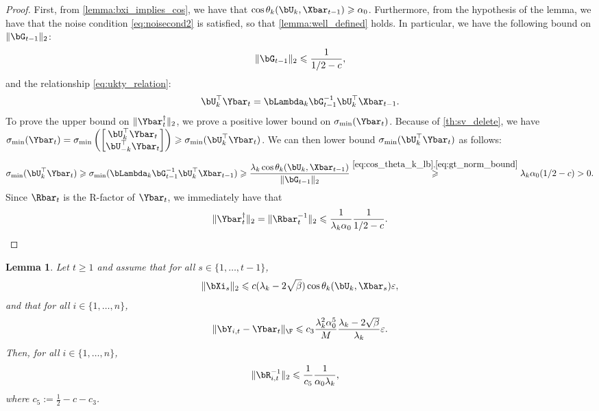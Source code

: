 \documentclass{article}
\theoremstyle{plain}
\newtheorem{lemma}[theorem]{Lemma}
\theoremstyle{definition}
\theoremstyle{remark}
\begin{document}
\begin{proof}
  First, from \cref{lemma:bxi_implies_cos}, we have that $\cos \theta_k(\bU_k, \Xbar_{t-1}) \geqslant \alpha_0$. Furthermore, from the hypothesis of the lemma, we have that the noise condition \eqref{eq:noisecond2} is satisfied, so that \cref{lemma:well_defined} holds. In particular, we have the following bound on $\Vert\bG_{t-1}\Vert_2$:
  \begin{align}\label{eq:gt_norm_bound}
    \Vert \bG_{t-1} \Vert_2 \leqslant \frac{1}{1/2 - c},
  \end{align}
  and the relationship \eqref{eq:ukty_relation}:
  \begin{align*}
    \bU_k^\top \Ybar_t = \bLambda_k \bG_{t-1}^{-1} \bU_k^\top \Xbar_{t-1}.
  \end{align*}
  To prove the upper bound on $\Vert\Ybar_t^\dagger\Vert_2$, we prove a positive lower bound on $\sigma_{\min}(\Ybar_t)$. Because of \cref{th:sv_delete}, we have $\sigma_{\min}(\Ybar_t) = \sigma_{\min}\left(\begin{bmatrix}
    \bU_k^\top \Ybar_t \\ \bU_{-k}^\top \Ybar_t
  \end{bmatrix}\right) \geqslant \sigma_{\min}(\bU_k^\top \Ybar_t)$. We can then lower bound $\sigma_{\min}(\bU_k^\top \Ybar_t)$ as follows: 
  \begin{align}
    \sigma_{\min}(\bU_k^\top \Ybar_t) \geqslant \sigma_{\min}(\bLambda_k \bG_{t-1}^{-1} \bU_k^\top \Xbar_{t-1}) \geqslant \frac{\lambda_k \cos \theta_k(\bU_k, \Xbar_{t-1})}{\Vert \bG_{t-1} \Vert_2} \stackrel{\eqref{eq:cos_theta_k_lb}, \eqref{eq:gt_norm_bound}}{\geqslant} {\lambda_k \alpha_0}(1/2 - c) > 0.
  \end{align}
  Since $\Rbar_t$ is the R-factor of $\Ybar_t$, we immediately have that 
  \begin{align*}
    \Vert\Ybar_t^\dagger\Vert_2 = \Vert \Rbar_t^{-1}\Vert_2 \leqslant \frac{1}{\lambda_k\alpha_0}\frac{1}{1/2 - c}.
  \end{align*}
\end{proof}

\begin{lemma}\label{lemma:riinv_ub}
  Let $t\geqslant 1$ and assume that for all $s \in \{1, \dots, t-1\}$,
  \begin{align*}
    \Vert\bXi_s\Vert_2 \leqslant c (\lambda_k - 2\sqrt{\beta}) \cos \theta_k(\bU_k, \Xbar_s) \varepsilon,
  \end{align*}
  and that for all $i\in\{1,\dots,n\}$,
  \begin{align*}
    \Vert\bY_{i,t} - \Ybar_t \Vert_\F \leqslant c_3\frac{\lambda_k^2 \alpha_0^5}{M} \frac{\lambda_k-2\sqrt{\beta}}{\lambda_k}\varepsilon.
  \end{align*}
  Then, for all $i\in\{1,\dots,n\}$,
  \begin{align}
    \Vert\bR_{i,t}^{-1}\Vert_2 & \leqslant \frac{1}{c_5}\frac{1}{\alpha_0\lambda_k}, \label{eq:ri_inv_ub}
  \end{align}
  where $c_5 := \frac{1}{2} - c - c_3$.
\end{lemma}
\end{document}
